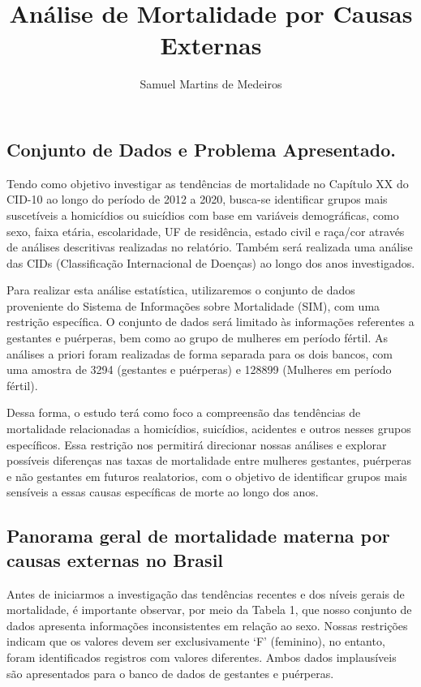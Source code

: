 \documentclass[
]{article}
\title{Análise de Mortalidade por Causas Externas}
\author{Samuel Martins de Medeiros}
\date{}
\begin{document}
\maketitle

\hypertarget{conjunto-de-dados-e-problema-apresentado.}{%
\subsection{Conjunto de Dados e Problema
Apresentado.}\label{conjunto-de-dados-e-problema-apresentado.}}

Tendo como objetivo investigar as tendências de mortalidade no Capítulo
XX do CID-10 ao longo do período de 2012 a 2020, busca-se identificar
grupos mais suscetíveis a homicídios ou suicídios com base em variáveis
demográficas, como sexo, faixa etária, escolaridade, UF de residência,
estado civil e raça/cor através de análises descritivas realizadas no
relatório. Também será realizada uma análise das CIDs (Classificação
Internacional de Doenças) ao longo dos anos investigados.

Para realizar esta análise estatística, utilizaremos o conjunto de dados
proveniente do Sistema de Informações sobre Mortalidade (SIM), com uma
restrição específica. O conjunto de dados será limitado às informações
referentes a gestantes e puérperas, bem como ao grupo de mulheres em
período fértil. As análises a priori foram realizadas de forma separada
para os dois bancos, com uma amostra de 3294 (gestantes e puérperas) e
128899 (Mulheres em período fértil).

Dessa forma, o estudo terá como foco a compreensão das tendências de
mortalidade relacionadas a homicídios, suicídios, acidentes e outros
nesses grupos específicos. Essa restrição nos permitirá direcionar
nossas análises e explorar possíveis diferenças nas taxas de mortalidade
entre mulheres gestantes, puérperas e não gestantes em futuros
realatorios, com o objetivo de identificar grupos mais sensíveis a essas
causas específicas de morte ao longo dos anos.

\hypertarget{panorama-geral-de-mortalidade-materna-por-causas-externas-no-brasil}{%
\subsection{Panorama geral de mortalidade materna por causas externas no
Brasil}\label{panorama-geral-de-mortalidade-materna-por-causas-externas-no-brasil}}

Antes de iniciarmos a investigação das tendências recentes e dos níveis
gerais de mortalidade, é importante observar, por meio da Tabela 1, que
nosso conjunto de dados apresenta informações inconsistentes em relação
ao sexo. Nossas restrições indicam que os valores devem ser
exclusivamente `F' (feminino), no entanto, foram identificados registros
com valores diferentes. Ambos dados implausíveis são apresentados para o
banco de dados de gestantes e puérperas.
\end{document}
